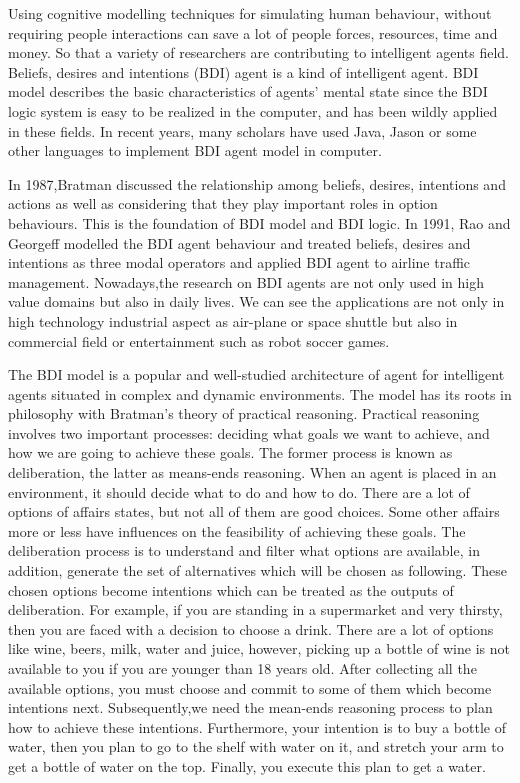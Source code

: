 Using cognitive modelling techniques for simulating human behaviour, without requiring people interactions can save a lot of people forces, resources, time and money. So that a variety of researchers are contributing to intelligent agents field. Beliefs, desires and intentions (BDI) agent is a kind of intelligent agent. BDI model describes the basic characteristics of agents' mental state since the BDI logic system is easy to be realized in the computer, and has been wildly applied in these fields. In recent years, many scholars have used Java, Jason or some other languages to implement BDI agent model in computer.

In 1987,Bratman\cite{MICHAEL_PlansResource_1988} discussed the relationship among beliefs, desires, intentions and actions as well as considering that they play important roles in option behaviours. This is the foundation of BDI model and BDI logic. In 1991, Rao and Georgeff\cite{Michael_BDIAgency_1999} modelled the BDI agent behaviour and treated beliefs, desires and intentions as three modal operators and applied BDI agent to airline traffic management. Nowadays,the research on BDI agents are not only used in high value domains but also in daily lives. We can see the applications are not only in high technology industrial aspect as air-plane or space shuttle but also in commercial field or entertainment such as robot soccer games.

The BDI model is a popular and well-studied architecture of agent for intelligent agents situated in complex and dynamic environments. The model has its roots in philosophy with Bratman’s theory of practical reasoning\cite{Sebastian_Hierarchical_2006}. Practical reasoning involves two important processes: deciding what goals we want to achieve, and how we are going to achieve these goals. The former process is known as deliberation, the latter as means-ends reasoning\cite{Gerhard_MultiSystem_1999}. When an agent is placed in an environment, it should decide what to do and how to do. There are a lot of options of affairs states, but not all of them are good choices. Some other affairs more or less have influences on the feasibility of achieving these goals. The deliberation process is to understand and filter what options are available, in addition, generate the set of alternatives which will be chosen as following. These chosen options become intentions which can be treated as the outputs of deliberation. For example, if you are standing in a supermarket and very thirsty, then you are faced with a decision to choose a drink. There are a lot of options like wine, beers, milk, water and juice, however, picking up a bottle of wine is not available to you if you are younger than 18 years old. After collecting all the available options, you must choose and commit to some of them which become intentions next. Subsequently,we need the mean-ends reasoning process to plan how to achieve these intentions. Furthermore, your intention is to buy a bottle of water, then you plan to go to the shelf with water on it, and stretch your arm to get a bottle of water on the top. Finally, you execute this plan to get a water.

